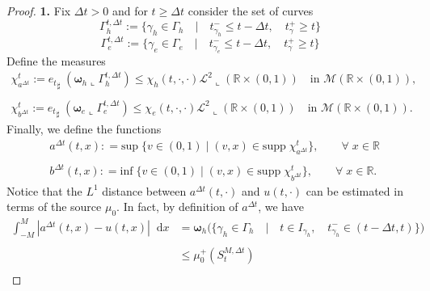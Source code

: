 \documentclass[11pt, twoside, reqno]{amsart}
\theoremstyle{definition}
\theoremstyle{remark}
\numberwithin{equation}{section}
\newcommand*\dif{\mathop{}\!\mathrm{d}}
\newcommand{\mr}[1]{\mathrm{#1}}
\newcommand{\bs}[1]{\boldsymbol{#1}}
\newcommand{\msc}[1]{\mathscr{#1}}
\begin{document}
\begin{proof}
\vspace{0.5cm}
\textbf{1.} Fix $\Delta t > 0$ and for $t \geq \Delta t$ consider the set of curves
$$
\Gamma_h^{t, \Delta t} := \Big\{ \gamma_h \in \Gamma_h \quad \big| \quad t_{\gamma_h}^- \leq t-\Delta t, \quad t^+_\gamma \geq t \Big\}
$$
$$
\Gamma_e^{t, \Delta t} := \Big\{ \gamma_e \in \Gamma_e \quad \big| \quad t_{\gamma_e}^- \leq t-\Delta t, \quad t^+_\gamma \geq t \Big\}
$$
Define the measures 
\begin{equation}
    \begin{aligned}
        \chi^t_{a^{\Delta t}} := {e_t}_{\sharp} \;  (\bs \omega_h \llcorner \Gamma_h^{t, \Delta t}) \leq \chi_h(t, \cdot, \cdot )  \msc L^2 \llcorner ( \mathbb R \times (0, 1)) \quad \text{in $\msc M(\mathbb R\times (0, 1))$},& \\
        & \\
         \chi^t_{b^{\Delta t}} := {e_t}_{\sharp} \;  (\bs \omega_e \llcorner \Gamma_e^{t, \Delta t}) \leq \chi_e(t, \cdot, \cdot )  \msc L^2 \llcorner ( \mathbb R \times (0, 1)) \quad \text{in $\msc M(\mathbb R\times (0, 1))$}.
    \end{aligned}
\end{equation}
Finally, we define the functions
\begin{equation}
    \begin{aligned}
       &  a^{\Delta t}(t, x) : = \mr{sup} \; \Big\{ v \in (0, 1) \; \big| \;  (v, x) \in \mr{supp} \; \chi^t_{a^{\Delta t}} \Big\}, \qquad \forall \; x \in \mathbb R\\
       & \\
       &  b^{\Delta t}(t, x) : = \mr{inf} \; \Big\{ v\in (0, 1) \; \big| \;  (v, x) \in \mr{supp} \; \chi^t_{b^{\Delta t}} \Big\}, \qquad \forall \; x \in \mathbb R.
    \end{aligned}
\end{equation}
Notice that the $L^1$ distance between $a^{\Delta t}(t, \cdot)$ and $u(t, \cdot)$ can be estimated in terms of the source $\mu_0$. In fact, by definition of $a^{\Delta t}$, we have
\begin{equation}
\begin{aligned}
    \int_{-M}^M |a^{\Delta t}(t, x) -u(t, x) | \dif x & = \bs \omega_h\Big(\Big\{ \gamma_h \in \Gamma_h \quad \big| \quad t \in I_{\gamma_h}, \quad t^-_{\gamma_h} \in (t-\Delta t, t)\Big\}\Big)\\
    & \\
    & \leq \mu_0^+(S_t^{M, \Delta t})\\
    \end{aligned}

\end{equation}
\end{proof}
\end{document}
